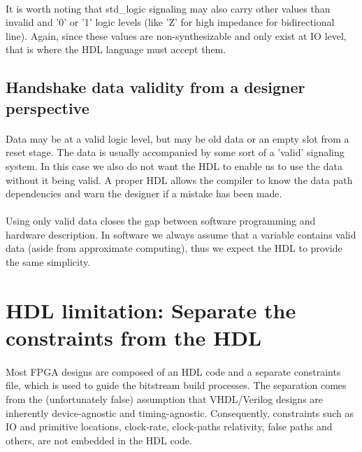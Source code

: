 \paragraph{}It is worth noting that std\_logic signaling may also carry other values than invalid and '0' or '1' logic levels (like 'Z' for high impedance for bidirectional line). Again, since these values are non-synthesizable and only exist at IO level, that is where the HDL language must accept them. 

\subsection*{Handshake data validity from a designer perspective} 
\paragraph{}Data may be at a valid logic level, but may be old data or an empty slot from a reset stage. The data is usually accompanied by some sort of a 'valid' signaling system. In this case we also do not want the HDL to enable us to use the data without it being valid. A proper HDL allows the compiler to know the data path dependencies and warn the designer if a mistake has been made. 

\paragraph{}Using only valid data closes the gap between software programming and hardware description. In software we always assume that a variable contains valid data (aside from approximate computing), thus we expect the HDL to provide the same simplicity. 


\section{HDL limitation: Separate the constraints from the HDL}
\label{sec:limitation separate contraints}
\paragraph{}Most FPGA designs are composed of an HDL code and a separate constraints file, which is used to guide the bitstream build processes. The separation comes from the (unfortunately false) assumption that VHDL/Verilog designs are inherently device-agnostic and timing-agnostic. Consequently, constraints such as IO and primitive locations, clock-rate, clock-paths relativity, false paths and others, are not embedded in the HDL code.  
